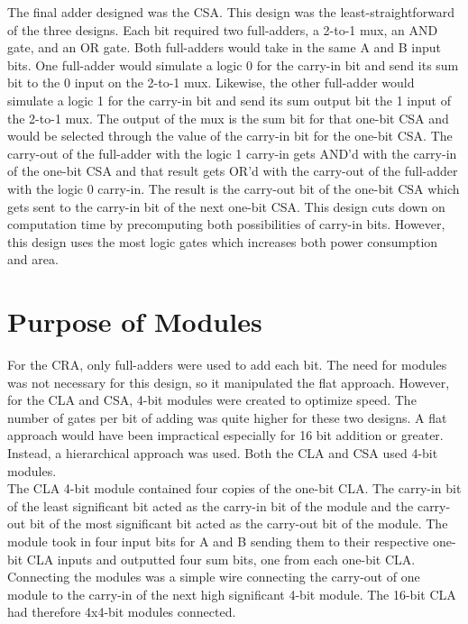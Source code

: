 \documentclass[journal, twocolumn, final,11pt,letterpaper]{IEEEtran}
\begin{document}
The final adder designed was the CSA.  This design was the least-straightforward of the three designs.  Each bit required two full-adders, a 2-to-1 mux, an AND gate, and an OR gate.  Both full-adders would take in the same A and B input bits.  One full-adder would simulate a logic 0 for the carry-in bit and send its sum bit to the 0 input on the 2-to-1 mux.  Likewise, the other full-adder would simulate a logic 1 for the carry-in bit and send its sum output bit the 1 input of the 2-to-1 mux.  The output of the mux is the sum bit for that one-bit CSA and would be selected through the value of the carry-in bit for the one-bit CSA. The carry-out of the full-adder with the logic 1 carry-in gets AND'd with the carry-in of the one-bit CSA and that result gets OR'd with the carry-out of the full-adder with the logic 0 carry-in.  The result is the carry-out bit of the one-bit CSA which gets sent to the carry-in bit of the next one-bit CSA.  This design cuts down on computation time by precomputing both possibilities of carry-in bits.  However, this design uses the most logic gates which increases both power consumption and area.  \\


\section{Purpose of Modules}
For the CRA, only full-adders were used to add each bit.  The need for modules was not necessary for this design, so it manipulated the flat approach.  However, for the CLA and CSA, 4-bit modules were created to optimize speed.  The number of gates per bit of adding was quite higher for these two designs.  A flat approach would have been impractical especially for 16 bit addition or greater.  Instead, a hierarchical approach was used.  Both the CLA and CSA used 4-bit modules.  \\

The CLA 4-bit module contained four copies of the one-bit CLA. The carry-in bit of the least significant bit acted as the carry-in bit of the module and the carry-out bit of the most significant bit acted as the carry-out bit of the module.  The module took in four input bits for A and B sending them to their respective one-bit CLA inputs and outputted four sum bits, one from each one-bit CLA.  Connecting the modules was a simple wire connecting the carry-out of one module to the carry-in of the next high significant 4-bit module.  The 16-bit CLA had therefore 4x4-bit modules connected.\\
\end{document}
